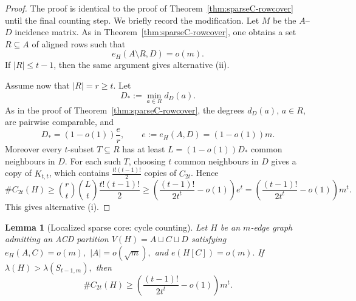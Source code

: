 \documentclass[11pt]{article}
\newtheorem{lemma}[theorem]{Lemma}
\theoremstyle{definition}
\theoremstyle{plain}
\begin{document}
\begin{proof}
The proof is identical to the proof of
Theorem~\ref{thm:sparseC-rowcover} until the final counting step.  We
briefly record the modification.  Let \(M\) be the \(A\)--\(D\)
incidence matrix.  As in Theorem~\ref{thm:sparseC-rowcover}, one obtains
a set \(R\subseteq A\) of aligned rows such that
\[
        e_H(A\setminus R,D)=o(m).
\]
If \(|R|\le t-1\), then the same argument gives alternative \textup{(ii)}.

Assume now that \(|R|=r\ge t\).  Let
\[
        D_\ast:=\min_{a\in R} d_D(a).
\]
As in the proof of Theorem~\ref{thm:sparseC-rowcover}, the degrees
\(d_D(a)\), \(a\in R\), are pairwise comparable, and
\[
        D_\ast=(1-o(1))\frac{e}{r},
        \qquad
        e:=e_H(A,D)=(1-o(1))m.
\]
Moreover every \(t\)-subset \(T\subseteq R\) has at least $L=(1-o(1))D_\ast$
common neighbours in \(D\).  For each such \(T\), choosing \(t\) common
neighbours in \(D\) gives a copy of \(K_{t,t}\), which contains
$        \frac{t!(t-1)!}{2}$
copies of \(C_{2t}\).  Hence
\[
        \texttt{\#}C_{2t}(H)\ge
        \binom rt\binom Lt\frac{t!(t-1)!}{2}       \ge
        \left(\frac{(t-1)!}{2t^t}-o(1)\right)e^t  =
        \left(\frac{(t-1)!}{2t^t}-o(1)\right)m^t.
\]
This gives alternative \textup{(i)}.
\end{proof}

\begin{lemma}[Localized sparse core: cycle counting]
\label{lem:cycle-localized-sparse}
Let \(H\) be an \(m\)-edge graph admitting an ACD partition
\(V(H)=A\sqcup C\sqcup D\) satisfying $e_H(A,C)=o(m),$ $       |A|=o(\sqrt m),$ and $e(H[C])=o(m).$
If $\lambda(H)>\lambda(S_{t-1,m}),$
then
\[
        \texttt{\#}C_{2t}(H)
        \ge
        \left(\frac{(t-1)!}{2t^t}-o(1)\right)m^t .
\]
\end{lemma}
\end{document}
